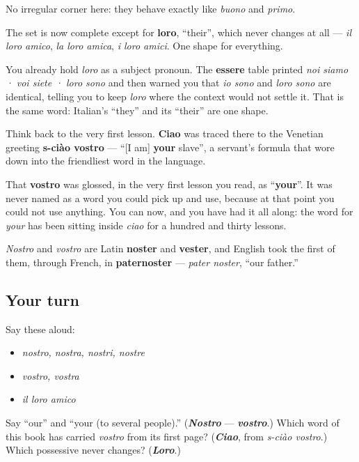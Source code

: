 No irregular corner here: they behave exactly like \emph{buono} and \emph{primo}.

The set is now complete except for \textbf{loro}, \textquotedblleft{}their\textquotedblright{}, which never changes at all — \emph{il loro amico}, \emph{la loro amica}, \emph{i loro amici}. One shape for everything.

You already hold \emph{loro} as a subject pronoun. The \textbf{essere} table printed \emph{noi siamo · voi siete · loro sono} and then warned you that \emph{io sono} and \emph{loro sono} are identical, telling you to keep \emph{loro} where the context would not settle it. That is the same word: Italian's \textquotedblleft{}they\textquotedblright{} and its \textquotedblleft{}their\textquotedblright{} are one shape.

\begin{cousinweb}
Think back to the very first lesson. \textbf{Ciao} was traced there to the Venetian greeting \textbf{s-ciào vostro} — \textquotedblleft{}{[}I am{]} \textbf{your} slave\textquotedblright{}, a servant's formula that wore down into the friendliest word in the language.

That \textbf{vostro} was glossed, in the very first lesson you read, as \textquotedblleft{}\textbf{your}\textquotedblright{}. It was never named as a word you could pick up and use, because at that point you could not use anything. You can now, and you have had it all along: the word for \emph{your} has been sitting inside \emph{ciao} for a hundred and thirty lessons.

\emph{Nostro} and \emph{vostro} are Latin \textbf{noster} and \textbf{vester}, and English took the first of them, through French, in \textbf{paternoster} — \emph{pater noster}, \textquotedblleft{}our father.\textquotedblright{}
\end{cousinweb}

\subsection*{Your turn}
Say these aloud:

\begin{itemize}
\raggedright
  \item \emph{nostro, nostra, nostri, nostre}
  \item \emph{vostro, vostra}
  \item \emph{il loro amico}
\end{itemize}

\begin{tcolorbox}[breakable,colback=teal!4,colframe=teal!35!black,title={Before you move on}]
Say \textquotedblleft{}our\textquotedblright{} and \textquotedblleft{}your (to several people).\textquotedblright{} (\emph{\textbf{Nostro}} — \emph{\textbf{vostro}}.) Which word of this book has carried \emph{vostro} from its first page? (\emph{\textbf{Ciao}}, from \emph{s-ciào vostro}.) Which possessive never changes? (\emph{\textbf{Loro}}.)
\end{tcolorbox}
